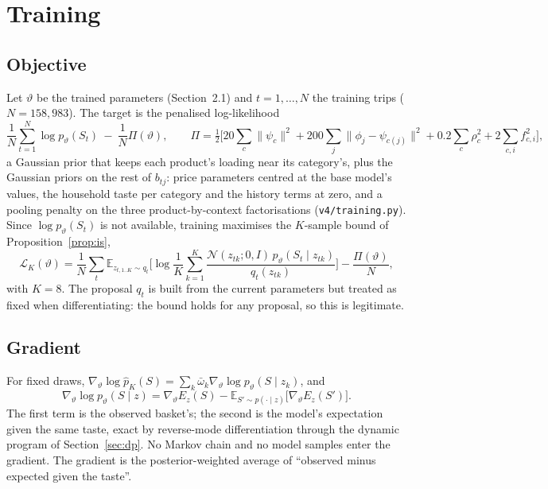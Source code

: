 \documentclass[11pt,a4paper]{article}
\theoremstyle{remark}
\newcommand{\N}{\mathcal N}
\newcommand{\E}{\mathbb E}
\begin{document}
\section{Training}
\label{sec:train}

\subsection{Objective}

Let $\vartheta$ be the trained parameters (Section~2.1) and $t=1,\dots,N$ the training trips
($N=158{,}983$). The target is the penalised log-likelihood
\[
\frac1N\sum_{t=1}^N\log p_\vartheta(S_t)\ -\ \frac{1}{N}\Pi(\vartheta),\qquad
\Pi=\tfrac12\Big[20\sum_c\lVert\psi_c\rVert^2+200\sum_j\lVert\phi_j-\psi_{c(j)}\rVert^2+0.2\sum_c\rho_c^2+2\sum_{c,i}f_{c,i}^2\Big],
\]
a Gaussian prior that keeps each product's loading near its category's, plus the Gaussian priors on the
rest of $b_{tj}$: price parameters centred at the base model's values, the household taste per category
and the history terms at zero, and a pooling penalty on the three product-by-context factorisations
(\texttt{v4/training.py}). Since $\log p_\vartheta(S_t)$ is not
available, training maximises the $K$-sample bound of Proposition~\ref{prop:is},
\begin{equation}
\mathcal L_K(\vartheta)=\frac1N\sum_t\E_{z_{t,1..K}\sim q_t}\Big[\log\frac1K\sum_{k=1}^K
\frac{\N(z_{tk};0,I)\,p_\vartheta(S_t\mid z_{tk})}{q_t(z_{tk})}\Big]-\frac{\Pi(\vartheta)}N ,
\label{eq:obj}
\end{equation}
with $K=8$. The proposal $q_t$ is built from the current parameters but treated as fixed when
differentiating: the bound holds for any proposal, so this is legitimate.

\subsection{Gradient}

For fixed draws, $\nabla_\vartheta\log\hat p_K(S)=\sum_k\bar\omega_k\nabla_\vartheta\log p_\vartheta(S\mid z_k)$, and
\begin{equation}
\nabla_\vartheta\log p_\vartheta(S\mid z)=\nabla_\vartheta E_z(S)-\E_{S'\sim p(\cdot\mid z)}\big[\nabla_\vartheta E_z(S')\big].
\label{eq:grad}
\end{equation}
The first term is the observed basket's; the second is the model's expectation given the same taste, exact
by reverse-mode differentiation through the dynamic program of Section~\ref{sec:dp}. No Markov chain and no
model samples enter the gradient. The gradient is the posterior-weighted average of ``observed minus
expected given the taste''.
\end{document}

